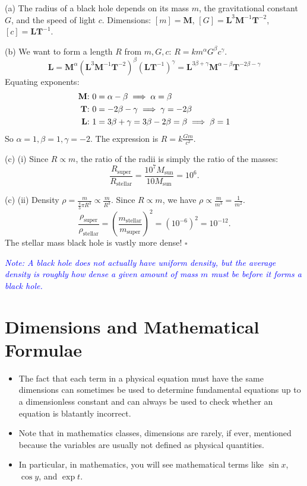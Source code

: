 \documentclass[11pt, letterpaper, openany]{book}
\newenvironment{solution}[1][Solution]{%
  \tcolorbox[blanker, breakable, left=1em,
    before skip=1em, after skip=1em,
    borderline west={2pt}{0pt}{PhysTeal},
    colback=PhysCream,
    before upper={\textcolor{PhysTeal}{\sffamily\bfseries #1.}\space}
  ]%
}{%
  \hfill\textcolor{PhysTeal}{\ensuremath{\square}}\endtcolorbox%
}
\begin{document}
\begin{solution}
(a) The radius of a black hole depends on its mass $m$, the gravitational constant $G$, and the speed of light $c$.
Dimensions: $[m] = \textbf{M}$, $[G] = \textbf{L}^3\textbf{M}^{-1}\textbf{T}^{-2}$, $[c] = \textbf{L}\textbf{T}^{-1}$.

(b) We want to form a length $R$ from $m, G, c$: $R = k m^\alpha G^\beta c^\gamma$.
\[ \textbf{L} = \textbf{M}^\alpha (\textbf{L}^3\textbf{M}^{-1}\textbf{T}^{-2})^\beta (\textbf{L}\textbf{T}^{-1})^\gamma = \textbf{L}^{3\beta+\gamma} \textbf{M}^{\alpha-\beta} \textbf{T}^{-2\beta-\gamma} \]
Equating exponents:
\begin{align*}
    \text{\textbf{M}: } 0 &= \alpha - \beta \implies \alpha = \beta \\
    \text{\textbf{T}: } 0 &= -2\beta - \gamma \implies \gamma = -2\beta \\
    \text{\textbf{L}: } 1 &= 3\beta + \gamma = 3\beta - 2\beta = \beta \implies \beta = 1
\end{align*}
So $\alpha = 1, \beta = 1, \gamma = -2$. The expression is $R = k\frac{Gm}{c^2}$.

(c) (i) Since $R \propto m$, the ratio of the radii is simply the ratio of the masses:
\[ \frac{R_{\text{super}}}{R_{\text{stellar}}} = \frac{10^7 M_{\text{sun}}}{10 M_{\text{sun}}} = 10^6. \]

(c) (ii) Density $\rho = \frac{m}{\frac{4}{3}\pi R^3} \propto \frac{m}{R^3}$. Since $R \propto m$, we have $\rho \propto \frac{m}{m^3} = \frac{1}{m^2}$.
\[ \frac{\rho_{\text{super}}}{\rho_{\text{stellar}}} = \left(\frac{m_{\text{stellar}}}{m_{\text{super}}}\right)^2 = (10^{-6})^2 = 10^{-12}. \]
The stellar mass black hole is vastly more dense!
\end{solution}

\textcolor{blue}{\textit{Note: A black hole does not actually have uniform density, but the average density is roughly how dense a given amount of mass $m$ must be before it forms a black hole.}}

\section{Dimensions and Mathematical Formulae}

\begin{itemize}
    \item The fact that each term in a physical equation must have the same dimensions can sometimes be used to determine fundamental equations up to a dimensionless constant and can always be used to check whether an equation is blatantly incorrect.
    \item Note that in mathematics classes, dimensions are rarely, if ever, mentioned because the variables are usually not defined as physical quantities.
    \item In particular, in mathematics, you will see mathematical terms like $\sin x$, $\cos y$, and $\exp t$.
\end{itemize}
\end{document}
